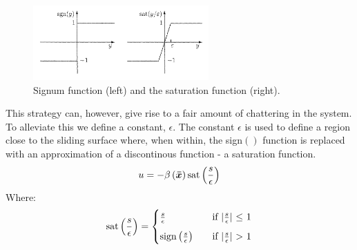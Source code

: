 \begin{figure}[H]
  \centering
  \includegraphics[width=0.6\textwidth]{saturation}
  \caption{Signum function (left) and the saturation function (right).}
  \label{fig:sign_sat}
\end{figure}
This strategy can, however, give rise to a fair amount of chattering in the system. To alleviate this we define a
constant, $\epsilon$. The constant $\epsilon$ is used to define a region close to the sliding surface where, when
within, the sign$()$ function is replaced with an approximation of a discontinous function - a saturation function.
\begin{equation}
  u = -\beta\left( \bm{\bar{x}} \right) \mathrm{sat}\left( \frac{s}{\epsilon} \right)
\end{equation}
Where:
\begin{equation}
  \mathrm{sat}\left( \frac{s}{\epsilon} \right) =
  \begin{cases}
    \frac{s}{\epsilon} &\quad \text{if $\vert\frac{s}{\epsilon}\vert$ $\leq$ 1} \\[2mm]
    \mathrm{sign}\left( \frac{s}{\epsilon} \right) &\quad \text{if $\vert \frac{s}{\epsilon}\vert$ $>$ 1}
  \end{cases}
\end{equation}

